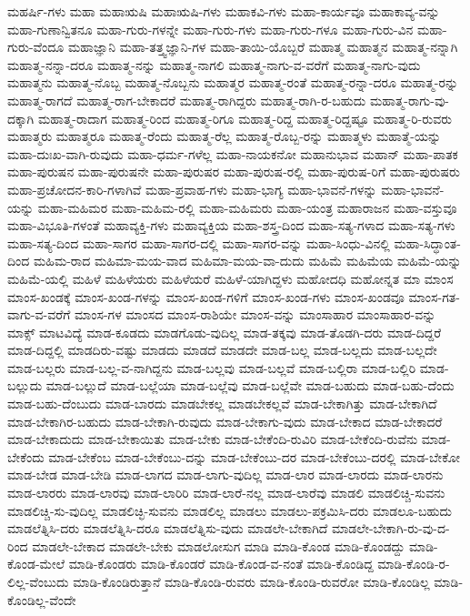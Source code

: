 {ಮಹರ್ಷಿ-ಗಳು
ಮಹಾ
ಮಹಾಋಷಿ
ಮಹಾಋಷಿ-ಗಳು
ಮಹಾಕವಿ-ಗಳು
ಮಹಾ-ಕಾರ್ಯವೂ
ಮಹಾಕಾವ್ಯ-ವನ್ನು
ಮಹಾ-ಗುಣಾನ್ವಿತನೂ
ಮಹಾ-ಗುರು-ಗಳನ್ನೇ
ಮಹಾ-ಗುರು-ಗಳು
ಮಹಾ-ಗುರು-ಗಳೂ
ಮಹಾ-ಗುರು-ವಿನ
ಮಹಾ-ಗುರು-ವೆಂದೂ
ಮಹಾಜ್ಞಾನಿ
ಮಹಾ-ತತ್ತ್ವಜ್ಞಾನಿ-ಗಳ
ಮಹಾ-ತಾಯಿ-ಯೊಬ್ಬರೆ
ಮಹಾತ್ಮ
ಮಹಾತ್ಮನ
ಮಹಾತ್ಮ-ನನ್ನಾಗಿ
ಮಹಾತ್ಮ-ನನ್ನಾ-ದರೂ
ಮಹಾತ್ಮ-ನನ್ನು
ಮಹಾತ್ಮ-ನಾಗಲಿ
ಮಹಾತ್ಮ-ನಾಗು-ವ-ವರೆಗೆ
ಮಹಾತ್ಮ-ನಾಗು-ವುದು
ಮಹಾತ್ಮನು
ಮಹಾತ್ಮ-ನೊಬ್ಬ
ಮಹಾತ್ಮ-ನೊಬ್ಬನು
ಮಹಾತ್ಮರ
ಮಹಾತ್ಮ-ರಂತೆ
ಮಹಾತ್ಮ-ರನ್ನಾ-ದರೂ
ಮಹಾತ್ಮ-ರನ್ನು
ಮಹಾತ್ಮ-ರಾಗದೆ
ಮಹಾತ್ಮ-ರಾಗ-ಬೇಕಾದರೆ
ಮಹಾತ್ಮ-ರಾಗಿದ್ದರು
ಮಹಾತ್ಮ-ರಾಗಿ-ರ-ಬಹುದು
ಮಹಾತ್ಮ-ರಾಗು-ವು-ದಕ್ಕಾಗಿ
ಮಹಾತ್ಮ-ರಾದಾಗ
ಮಹಾತ್ಮ-ರಿಂದ
ಮಹಾತ್ಮ-ರಿಗೂ
ಮಹಾತ್ಮ-ರಿದ್ದ
ಮಹಾತ್ಮ-ರಿದ್ದಷ್ಟೂ
ಮಹಾತ್ಮ-ರಿ-ರುವರು
ಮಹಾತ್ಮರು
ಮಹಾತ್ಮರೂ
ಮಹಾತ್ಮ-ರೆಂದು
ಮಹಾತ್ಮ-ರೆಲ್ಲ
ಮಹಾತ್ಮ-ರೊಬ್ಬ-ರನ್ನು
ಮಹಾತ್ಮಳು
ಮಹಾತ್ಮೆ-ಯನ್ನು
ಮಹಾ-ದುಃಖ-ವಾಗಿ-ರುವುದು
ಮಹಾ-ಧರ್ಮ-ಗಳೆಲ್ಲ
ಮಹಾ-ನಾಯಕನೋ
ಮಹಾನುಭಾವ
ಮಹಾನ್
ಮಹಾ-ಪಾತಕ
ಮಹಾ-ಪುರುಷನ
ಮಹಾ-ಪುರುಷನೇ
ಮಹಾ-ಪುರುಷರ
ಮಹಾ-ಪುರುಷ-ರಲ್ಲಿ
ಮಹಾ-ಪುರುಷ-ರಿಗೆ
ಮಹಾ-ಪುರುಷರು
ಮಹಾ-ಪ್ರಚೋದನ-ಕಾರಿ-ಗಳಾಗಿವೆ
ಮಹಾ-ಪ್ರವಾಹ-ಗಳು
ಮಹಾ-ಭಾಗ್ಯ
ಮಹಾ-ಭಾವನೆ-ಗಳನ್ನು
ಮಹಾ-ಭಾವನೆ-ಯನ್ನು
ಮಹಾ-ಮಹಿಮರ
ಮಹಾ-ಮಹಿಮ-ರಲ್ಲಿ
ಮಹಾ-ಮಹಿಮರು
ಮಹಾ-ಯಂತ್ರ
ಮಹಾರಾಜನ
ಮಹಾ-ವಸ್ತುವೂ
ಮಹಾ-ವಿಭೂತಿ-ಗಳಂತೆ
ಮಹಾವ್ಯಕ್ತಿ-ಗಳು
ಮಹಾವ್ಯಕ್ತಿಯ
ಮಹಾ-ಶಸ್ತ್ರ-ದಿಂದ
ಮಹಾ-ಸತ್ಯ-ಗಳಾದ
ಮಹಾ-ಸತ್ಯ-ಗಳು
ಮಹಾ-ಸತ್ಯ-ದಿಂದ
ಮಹಾ-ಸಾಗರ
ಮಹಾ-ಸಾಗರ-ದಲ್ಲಿ
ಮಹಾ-ಸಾಗರ-ವನ್ನು
ಮಹಾ-ಸಿಂಧು-ವಿನಲ್ಲಿ
ಮಹಾ-ಸಿದ್ಧಾಂತ-ದಿಂದ
ಮಹಿಮ-ರಾದ
ಮಹಿಮಾ-ಮಯ-ವಾದ
ಮಹಿಮಾ-ಮಯ-ವಾ-ದುದು
ಮಹಿಮೆ
ಮಹಿಮೆಯ
ಮಹಿಮೆ-ಯನ್ನು
ಮಹಿಮೆ-ಯಲ್ಲಿ
ಮಹಿಳೆ
ಮಹಿಳೆಯರು
ಮಹಿಳೆಯರೆ
ಮಹಿಳೆ-ಯಾಗಿದ್ದಳು
ಮಹೋದಧಿ
ಮಹೋನ್ನತ
ಮಾ
ಮಾಂಸ
ಮಾಂಸ-ಖಂಡಕ್ಕೆ
ಮಾಂಸ-ಖಂಡ-ಗಳನ್ನು
ಮಾಂಸ-ಖಂಡ-ಗಳಿಗೆ
ಮಾಂಸ-ಖಂಡ-ಗಳು
ಮಾಂಸ-ಖಂಡವೂ
ಮಾಂಸ-ಗತ-ವಾಗು-ವ-ವರೆಗೆ
ಮಾಂಸ-ಗಳ
ಮಾಂಸದ
ಮಾಂಸ-ರಾಶಿಯೇ
ಮಾಂಸ-ವನ್ನು
ಮಾಂಸಾಹಾರ
ಮಾಂಸಾಹಾರ-ವನ್ನು
ಮಾಕ್ಸ್
ಮಾಟವಿದ್ಯೆ
ಮಾಡ-ಕೂಡದು
ಮಾಡಗೊಡು-ವುದಿಲ್ಲ
ಮಾಡ-ತಕ್ಕವು
ಮಾಡ-ತೊಡಗಿ-ದರು
ಮಾಡ-ದಿದ್ದರೆ
ಮಾಡ-ದಿದ್ದಲ್ಲಿ
ಮಾಡದಿರು-ವಷ್ಟು
ಮಾಡದು
ಮಾಡದೆ
ಮಾಡದೇ
ಮಾಡ-ಬಲ್ಲ
ಮಾಡ-ಬಲ್ಲದು
ಮಾಡ-ಬಲ್ಲದೇ
ಮಾಡ-ಬಲ್ಲರು
ಮಾಡ-ಬಲ್ಲ-ವ-ನಾಗಿದ್ದನು
ಮಾಡ-ಬಲ್ಲವು
ಮಾಡ-ಬಲ್ಲವೆ
ಮಾಡ-ಬಲ್ಲಿರಾ
ಮಾಡ-ಬಲ್ಲಿರಿ
ಮಾಡ-ಬಲ್ಲುದು
ಮಾಡ-ಬಲ್ಲುದೆ
ಮಾಡ-ಬಲ್ಲೆಯಾ
ಮಾಡ-ಬಲ್ಲೆವು
ಮಾಡ-ಬಲ್ಲೆವೇ
ಮಾಡ-ಬಹುದು
ಮಾಡ-ಬಹು-ದೆಂದು
ಮಾಡ-ಬಹು-ದೆಂಬುದು
ಮಾಡ-ಬಾರದು
ಮಾಡಬೇಕಲ್ಲ
ಮಾಡಬೇಕಲ್ಲವೆ
ಮಾಡ-ಬೇಕಾಗಿತ್ತು
ಮಾಡ-ಬೇಕಾಗಿದೆ
ಮಾಡ-ಬೇಕಾಗಿರ-ಬಹುದು
ಮಾಡ-ಬೇಕಾಗಿ-ರುವುದು
ಮಾಡ-ಬೇಕಾಗು-ವುದು
ಮಾಡ-ಬೇಕಾದ
ಮಾಡ-ಬೇಕಾದರೆ
ಮಾಡ-ಬೇಕಾದುದು
ಮಾಡ-ಬೇಕಾಯಿತು
ಮಾಡ-ಬೇಕು
ಮಾಡ-ಬೇಕೆಂದಿ-ರುವಿರಿ
ಮಾಡ-ಬೇಕೆಂದಿ-ರುವೆನು
ಮಾಡ-ಬೇಕೆಂದು
ಮಾಡ-ಬೇಕೆಂಬ
ಮಾಡ-ಬೇಕೆಂಬು-ದನ್ನು
ಮಾಡ-ಬೇಕೆಂಬು-ದರ
ಮಾಡ-ಬೇಕೆಂಬು-ದರಲ್ಲಿ
ಮಾಡ-ಬೇಕೋ
ಮಾಡ-ಬೇಡ
ಮಾಡ-ಬೇಡಿ
ಮಾಡ-ಲಾಗದ
ಮಾಡ-ಲಾಗು-ವುದಿಲ್ಲ
ಮಾಡ-ಲಾರ
ಮಾಡ-ಲಾರದು
ಮಾಡ-ಲಾರನು
ಮಾಡ-ಲಾರರು
ಮಾಡ-ಲಾರವು
ಮಾಡ-ಲಾರಿರಿ
ಮಾಡ-ಲಾರೆ-ನಲ್ಲ
ಮಾಡ-ಲಾರೆವು
ಮಾಡಲಿ
ಮಾಡಲಿಚ್ಚಿ-ಸುವನು
ಮಾಡಲಿಚ್ಚಿ-ಸು-ವುದಿಲ್ಲ
ಮಾಡಲಿಚ್ಛಿ-ಸುವನು
ಮಾಡಲಿಲ್ಲ
ಮಾಡಲು
ಮಾಡಲು-ಪಕ್ರಮಿಸಿ-ದರು
ಮಾಡಲೂ-ಬಹುದು
ಮಾಡಲೆತ್ನಿಸಿ-ದರು
ಮಾಡಲೆತ್ನಿಸಿ-ದರೂ
ಮಾಡಲೆತ್ನಿಸು-ವುದು
ಮಾಡಲೇ-ಬೇಕಾಗಿದೆ
ಮಾಡಲೇ-ಬೇಕಾಗಿ-ರು-ವು-ದ-ರಿಂದ
ಮಾಡಲೇ-ಬೇಕಾದ
ಮಾಡಲೇ-ಬೇಕು
ಮಾಡಲೋಸುಗ
ಮಾಡಿ
ಮಾಡಿ-ಕೊಂಡ
ಮಾಡಿ-ಕೊಂಡದ್ದು
ಮಾಡಿ-ಕೊಂಡ-ಮೇಲೆ
ಮಾಡಿ-ಕೊಂಡರು
ಮಾಡಿ-ಕೊಂಡರೆ
ಮಾಡಿ-ಕೊಂಡ-ವ-ನಂತೆ
ಮಾಡಿ-ಕೊಂಡಿದ್ದ
ಮಾಡಿ-ಕೊಂಡಿ-ರ-ಲಿಲ್ಲ-ವೆಂಬುದು
ಮಾಡಿ-ಕೊಂಡಿರುತ್ತಾನೆ
ಮಾಡಿ-ಕೊಂಡಿ-ರುವರು
ಮಾಡಿ-ಕೊಂಡಿ-ರುವರೋ
ಮಾಡಿ-ಕೊಂಡಿಲ್ಲ
ಮಾಡಿ-ಕೊಂಡಿಲ್ಲ-ವೆಂದೇ
}
